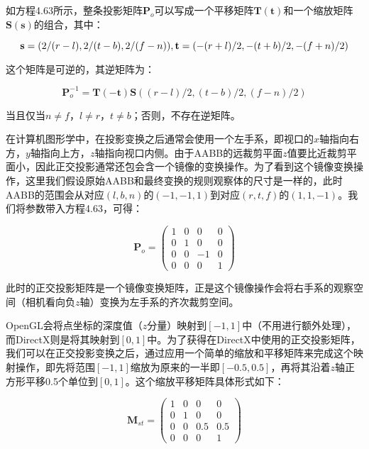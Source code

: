 \documentclass[
  paper=a4,
  ,captions=tableheading
]{scrartcl}
\renewenvironment{quote}{\begin{customblockquote}\list{}{\rightmargin=0em\leftmargin=0em}%
\item\relax\color{blockquote-text}\ignorespaces}{\unskip\unskip\endlist\end{customblockquote}}
\begin{document}
如方程4.63所示，整条投影矩阵\(\mathbf{P}_{o}\)可以写成一个平移矩阵\(\mathbf{T(t)}\)和一个缩放矩阵\(\mathbf{S(s)}\)的组合，其中：

\[
  \mathbf{s}=(2 /(r-l), 2 /(t-b), 2 /(f-n)),\\[2mm]
  \mathbf{t}=(-(r+l) / 2,-(t+b) / 2,-(f+n) / 2)
\]

这个矩阵是可逆的，其逆矩阵为：

\[
  \mathbf{P}_{o}^{-1}=\mathbf{T}(-\mathbf{t}) \mathbf{S}((r-l) / 2,(t-b) / 2,(f-n) / 2)
\]

\begin{quote}
  当且仅当\(n \ne f\)，\(l \ne r\)，\(t \ne b\)；否则，不存在逆矩阵。
\end{quote}

在计算机图形学中，在投影变换之后通常会使用一个左手系，即视口的\(x\)轴指向右方，\(y\)轴指向上方，\(z\)轴指向视口内侧。由于AABB的远裁剪平面\(z\)值要比近裁剪平面小，因此正交投影通常还包会含一个镜像的变换操作。为了看到这个镜像变换操作，这里我们假设原始AABB和最终变换的规则观察体的尺寸是一样的，此时AABB的范围会从对应\((l, b, n)\)的\((-1,-1,1)\)到对应\((r, t, f)\)的\((1, 1, -1)\)。我们将参数带入方程4.63，可得：

\[
  \mathbf{P}_{o}=
  \left(\begin{array}{cccc}
      1 & 0 & 0  & 0 \\
      0 & 1 & 0  & 0 \\
      0 & 0 & -1 & 0 \\
      0 & 0 & 0  & 1
    \end{array}\right)
  \tag{4.64}
\]

此时的正交投影矩阵是一个镜像变换矩阵，正是这个镜像操作会将右手系的观察空间（相机看向负\(z\)轴）变换为左手系的齐次裁剪空间。

OpenGL会将点坐标的深度值（\(z\)分量）映射到\([-1,1]\)中（不用进行额外处理），而DirectX则是将其映射到\([0,1]\)中。为了获得在DirectX中使用的正交投影矩阵，我们可以在正交投影变换之后，通过应用一个简单的缩放和平移矩阵来完成这个映射操作，即先将范围\([-1,1]\)缩放为原来的一半即\([-0.5,0.5]\)，再将其沿着\(z\)轴正方形平移0.5个单位到\([0,1]\)。这个缩放平移矩阵具体形式如下：

\[
  \mathbf{M}_{s t}=\left(\begin{array}{cccc}1 & 0 & 0 & 0 \\ 0 & 1 & 0 & 0 \\ 0 & 0 & 0.5 & 0.5 \\ 0 & 0 & 0 & 1\end{array}\right)
  \tag{4.65}
\]
\end{document}
